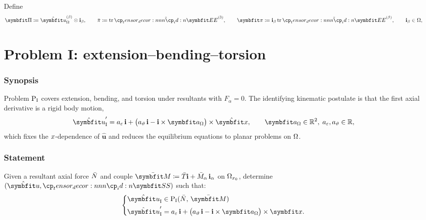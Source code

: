 Define
\begin{equation}
\PlaneShape \coloneq \hat{\bm u}_{\Section}^{(\beta)}\otimes\FrameBasis_{\beta},
\qquad
\bar{\pi} \coloneq\operatorname{tr}\tilde{\StrainTensor}^{(3)},
\qquad
\PlaneShapeStrain
\coloneq \FrameBasis_\beta \operatorname{tr}\tilde{\StrainTensor}^{(\beta)},
\qquad \FrameBasis_\beta \in\Section,
\label{eq:def-Theta}
\end{equation}

\section{Problem I: extension--bending--torsion}\label{sec:iesan-pi}

\subsubsection*{Synopsis}
Problem \(\mathrm{P}_{\rm I}\) covers extension, bending, and torsion under resultants with \(F_\alpha=0\). The identifying kinematic postulate is that the first axial derivative is a rigid body motion,
\[
\hat{\bm u}'_{\rm I}= a_{\varepsilon}\,\FrameBasis
+\big(a_{\vartheta}\,\FrameBasis-\FrameBasis\times\bm{a}_{\Section}\big)\times\hat{\bm{x}},
\qquad
\bm{a}_{\Section}\in\mathbb{R}^2,\; a_{\varepsilon},a_{\vartheta}\in\mathbb{R},
\]
which fixes the \(x\)-dependence of \(\hat{\bm u}\) and reduces the equilibrium equations to planar problems on \(\Omega\).

\subsubsection*{Statement}
Given a resultant axial force \(\bar{N}\) and couple \(\MomentRxn\coloneq\TwistRxn\FrameBasis + \bar{M}_{\alpha}\,\FrameBasis_{\alpha}\) on \(\Omega_{x_0}\),
determine \((\hat{\bm u},\StressTensor)\) such that:
\begin{equation}
\left\{
\begin{aligned}
\hat{\bm u}_{\rm I} &\in \mathrm{P}_{\rm I}(\AxialRxn,\,\MomentRxn) \\
\hat{\bm u}'_{\rm I}&= a_{\varepsilon}\,\FrameBasis
+\big(a_{\vartheta}\,\FrameBasis-\FrameBasis\times\bm{a}_{\Section}\big)\times\bm{x}.
\end{aligned}
\right.
\label{eq:iesan-problem-1}
\end{equation}

